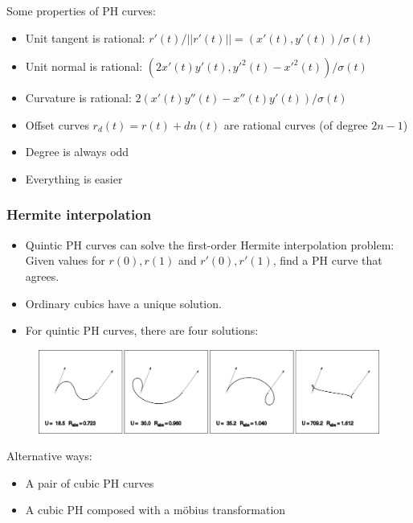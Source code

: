 \documentclass{beamer}
\begin{document}
\begin{frame}

Some properties of PH curves:
\begin{itemize}
  \item Unit tangent is rational: $r'(t)/||r'(t)|| = (x'(t), y'(t))/\sigma(t)$
  \pause
  \item Unit normal is rational: $(2x'(t)y'(t), y'^2(t) - x'^2(t))/\sigma(t)$
  \pause
  \item Curvature is rational: $2(x'(t)y''(t) - x''(t)y'(t))/\sigma(t)$
  \pause
  \item Offset curves $r_d(t) = r(t) + dn(t)$ are rational curves (of degree $2n-1$)
  \pause
  \item Degree is always odd
  \pause
  \item Everything is easier 
\end{itemize}

\end{frame}

\begin{frame}
\frametitle{Hermite interpolation}

\begin{itemize}

\item Quintic PH curves can solve the first-order Hermite interpolation problem:
Given values for $r(0),r(1)$ and $r'(0), r'(1)$, find a PH curve that agrees.
\pause
\item Ordinary cubics have a unique solution.
\pause
\item For quintic PH curves, there are four solutions:
\end{itemize}
\begin{figure}
\centering
\vspace{-8mm}
\includegraphics{ph_curve_hermite_solutions.png}
\end{figure}
\vspace{-2mm}
\pause
Alternative ways:
\begin{itemize}
  \item A pair of cubic PH curves
  \pause
  \item A cubic PH composed with a möbius transformation
\end{itemize}
\end{frame}
\end{document}
